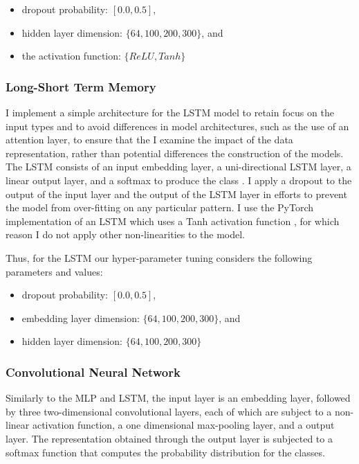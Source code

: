 \begin{itemize}
  \item dropout probability: $[0.0, 0.5]$,
  \item hidden layer dimension: $\{64, 100, 200, 300\}$, and
  \item the activation function: $\{ReLU, Tanh\}$
\end{itemize}

\subsubsection{Long-Short Term Memory}
I implement a simple architecture for the LSTM model to retain focus on the input types and to avoid differences in model architectures, such as the use of an attention layer, to ensure that the I examine the impact of the data representation, rather than potential differences the construction of the models.
The LSTM consists of an input embedding layer, a uni-directional LSTM layer, a linear output layer, and a softmax to produce the class .
I apply a dropout to the output of the input layer and the output of the LSTM layer in efforts to prevent the model from over-fitting on any particular pattern.
I use the PyTorch implementation of an LSTM which uses a Tanh activation function \citep{Paszke:2019}, for which reason I do not apply other non-linearities to the model.

Thus, for the LSTM our hyper-parameter tuning considers the following parameters and values:

\begin{itemize}
  \item dropout probability: $[0.0, 0.5]$,
  \item embedding layer dimension: $\{64, 100, 200, 300\}$, and
  \item hidden layer dimension: $\{64, 100, 200, 300\}$
\end{itemize}

\subsubsection{Convolutional Neural Network}
Similarly to the MLP and LSTM, the input layer is an embedding layer, followed by three two-dimensional convolutional layers, each of which are subject to a non-linear activation function, a one dimensional max-pooling layer, and a output layer.
The representation obtained through the output layer is subjected to a softmax function that computes the probability distribution for the classes.

